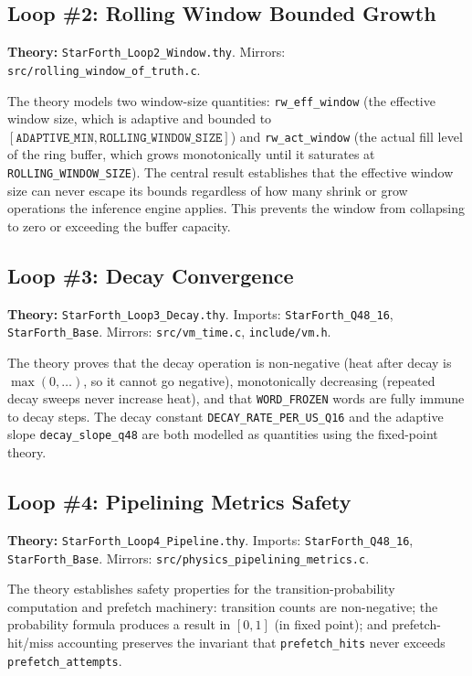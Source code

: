 \subsection{Loop \#2: Rolling Window Bounded Growth}

\textbf{Theory:} \texttt{StarForth\_Loop2\_Window.thy}.
Mirrors: \texttt{src/rolling\_window\_of\_truth.c}.

The theory models two window-size quantities: \texttt{rw\_eff\_window} (the
effective window size, which is adaptive and bounded to
$[\texttt{ADAPTIVE\_MIN}, \texttt{ROLLING\_WINDOW\_SIZE}]$) and
\texttt{rw\_act\_window} (the actual fill level of the ring buffer, which grows
monotonically until it saturates at \texttt{ROLLING\_WINDOW\_SIZE}). The
central result establishes that the effective window size can never escape its
bounds regardless of how many shrink or grow operations the inference engine
applies. This prevents the window from collapsing to zero or exceeding the
buffer capacity.

\subsection{Loop \#3: Decay Convergence}

\textbf{Theory:} \texttt{StarForth\_Loop3\_Decay.thy}.
Imports: \texttt{StarForth\_Q48\_16}, \texttt{StarForth\_Base}.
Mirrors: \texttt{src/vm\_time.c}, \texttt{include/vm.h}.

The theory proves that the decay operation is non-negative (heat after decay is
$\max(0, \ldots)$, so it cannot go negative), monotonically decreasing
(repeated decay sweeps never increase heat), and that \texttt{WORD\_FROZEN}
words are fully immune to decay steps. The decay constant
\texttt{DECAY\_RATE\_PER\_US\_Q16} and the adaptive slope
\texttt{decay\_slope\_q48} are both modelled as \Qtype{} quantities using the
fixed-point theory.

\subsection{Loop \#4: Pipelining Metrics Safety}

\textbf{Theory:} \texttt{StarForth\_Loop4\_Pipeline.thy}.
Imports: \texttt{StarForth\_Q48\_16}, \texttt{StarForth\_Base}.
Mirrors: \texttt{src/physics\_pipelining\_metrics.c}.

The theory establishes safety properties for the transition-probability
computation and prefetch machinery: transition counts are non-negative;
the probability formula produces a result in $[0, 1]$ (in \Qtype{} fixed
point); and prefetch-hit/miss accounting preserves the invariant that
\texttt{prefetch\_hits} never exceeds \texttt{prefetch\_attempts}.


